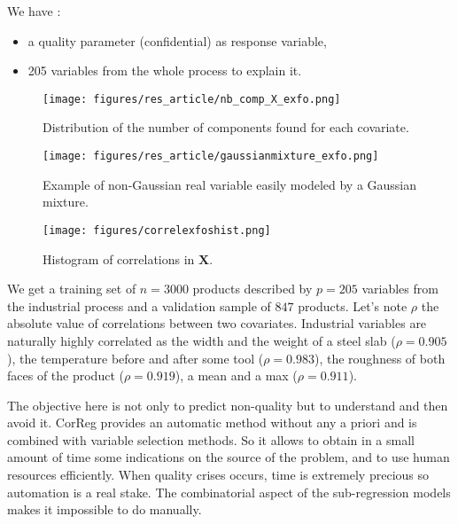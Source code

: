\documentclass[11pt,a4paper]{article}
\begin{document}
We have :
		\begin{itemize}
			\item a quality parameter (confidential) as response variable,
			\item 205 variables from the whole process to explain it.
		\end{itemize}

\begin{figure}[h!]
	\begin{minipage}[t]{.30\linewidth}
			\texttt{[image: figures/res\_article/nb\_comp\_X\_exfo.png]}%
			\caption{Distribution of the number of components found for each covariate.}\label{graphMixmod}
	\end{minipage} \hfill
	\begin{minipage}[t]{.30\linewidth}
			\texttt{[image: figures/res\_article/gaussianmixture\_exfo.png]}%
			\caption{Example of non-Gaussian real variable easily modeled by a Gaussian mixture.}
	\end{minipage} \hfill
   \begin{minipage}[t]{.30\linewidth}
			\texttt{[image: figures/correlexfoshist.png]} 
			\caption{Histogram of correlations in $\boldsymbol{X}$.} \label{compareMSEexfos}
   \end{minipage}
\end{figure}   			
	We get a training set of $n=3 000$ products described by $p=205$ variables from the industrial process and a validation sample of $847$ products.
	Let's note $\rho$ the absolute value of correlations between two covariates. Industrial variables are naturally highly correlated as the width and the weight of a steel slab ($\rho=0.905$), the temperature before and after some tool ($\rho=0.983$), the  roughness of both faces of the product ($\rho= 0.919$), a mean and a max ($\rho=0.911$). 
	
	The objective here is not only to predict non-quality but to understand and then avoid it. CorReg provides an automatic method without any a priori and is combined with variable selection methods. So it allows to obtain in a small amount of time some indications on the source of the problem, and to use human resources efficiently. When quality crises occurs, time is extremely precious so automation is a real stake. The combinatorial aspect of the sub-regression models makes it impossible to do manually.
		
\end{document}
